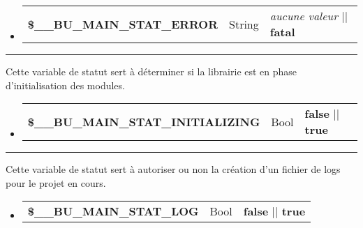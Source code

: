 \documentclass[a4paper,10pt]{article}
\begin{document}
\begin{justify}
     \begin{itemize}
        \item
        {
            \begin{tabular}{l|l|l}
                \textbf{\color{orange}\$\_\_BU\_MAIN\_STAT\_ERROR}  & String    & \textit{aucune valeur} || \textbf{fatal}\\[1\baselineskip]
            \end{tabular}
        }
    \end{itemize}
\end{justify}


\par\noindent\rule{\textwidth}{0.4pt}

\begin{justify}
    Cette variable de statut sert à déterminer si la librairie est en phase d'initialisation des modules.
\end{justify}

\begin{justify}
     \begin{itemize}
        \item
        {
            \begin{tabular}{l|l|l}
                \textbf{\color{orange}\$\_\_BU\_MAIN\_STAT\_INITIALIZING}       & Bool  & \textbf{false} || \textbf{true}\\[1\baselineskip]
            \end{tabular}
        }
    \end{itemize}
\end{justify}


\par\noindent\rule{\textwidth}{0.4pt}

\begin{justify}
    Cette variable de statut sert à autoriser ou non la création d'un fichier de logs pour le projet en cours.
\end{justify}

\begin{justify}
     \begin{itemize}
        \item
        {
            \begin{tabular}{l|l|l}
                \textbf{\color{orange}\$\_\_BU\_MAIN\_STAT\_LOG}    & Bool      & \textbf{false} || \textbf{true}\\[1\baselineskip]
            \end{tabular}
        }
    \end{itemize}
\end{justify}
\end{document}

